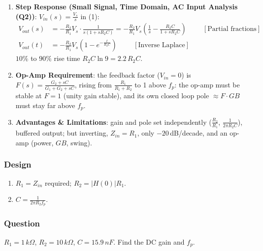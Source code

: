\begin{enumerate}
    \paragraph{At Output:} the op-amp output, \(Z_{out} = \frac{R_o}{1 + AF} \approx 0\)
    (Section~\ref{sec:amp_inverting}): unlike the passive RC (Section~\ref{sec:theory_general_loading})
    the next stage does not load it.
  \item \textbf{Step Response (Small Signal, Time Domain, AC Input Analysis (Q2))}: \(V_{in}(s) = \frac{V_s}{s}\) in (1):
    \begin{align*}
      V_{out}(s) &= -\frac{R_2}{R_1}V_s\cdot\frac{1}{s(1 + sR_2C)} = -\frac{R_2}{R_1}V_s\left(\frac{1}{s} - \frac{R_2C}{1 + sR_2C}\right) \hspace{1cm} [\text{Partial fractions}] \\
      V_{out}(t) &= -\frac{R_2}{R_1}V_s\left(1 - e^{-\frac{t}{R_2C}}\right) \hspace{1cm} [\text{Inverse Laplace}]
    \end{align*}
    \(10\%\) to \(90\%\) rise time \(R_2C\ln 9 = 2.2\,R_2C\).
  \item \textbf{Op-Amp Requirement}: the feedback factor (\(V_{in} = 0\)) is
    \(F(s) = \frac{G_2 + sC}{G_1 + G_2 + sC}\), rising from \(\frac{R_1}{R_1 + R_2}\) to 1 above \(f_p\): the op-amp must be stable at
    \(F = 1\) (unity gain stable), and its own closed loop pole \(\approx F \cdot GB\) must stay far above \(f_p\).
  \item \textbf{Advantages \& Limitations}: gain and pole set independently
    (\(\frac{R_2}{R_1}\), \(\frac{1}{2\pi R_2 C}\)), buffered output; but inverting, \(Z_{in} = R_1\), only
    \(-20\,\)dB/decade, and an op-amp (power, \(GB\), swing).
\end{enumerate}

\subsubsection{Design}
\begin{enumerate}
  \item \(R_1 = Z_{in}\) required; \(R_2 = |H(0)| R_1\).
  \item \(C = \frac{1}{2\pi R_2 f_p}\).
\end{enumerate}

\subsubsection{Question}
\(R_1 = 1\,k\Omega\), \(R_2 = 10\,k\Omega\), \(C = 15.9\,nF\). Find the DC gain and
\(f_p\).
